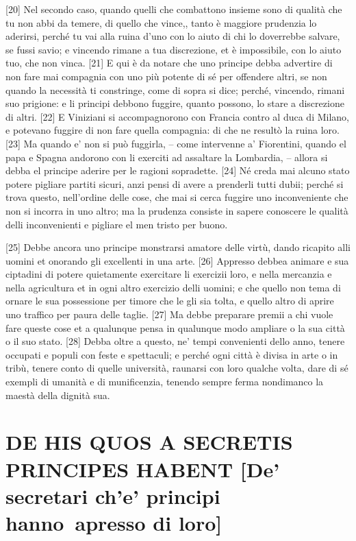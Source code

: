 \quebra

{[}20{]} Nel secondo caso, quando quelli che combattono insieme sono di
qualità che tu non abbi da temere, di quello che vince,, tanto è
maggiore prudenzia lo aderirsi, perché tu vai alla ruina d'uno con lo
aiuto di chi lo doverrebbe salvare, se fussi savio; e vincendo rimane a
tua discrezione, et è impossibile, con lo aiuto tuo, che non vinca.
{[}21{]} E qui è da notare che uno principe debba advertire di non fare
mai compagnia con uno più potente di sé per offendere altri, se non
quando la necessità ti constringe, come di sopra si dice; perché,
vincendo, rimani suo prigione: e li principi debbono fuggire, quanto
possono, lo stare a discrezione di altri. {[}22{]} E Viniziani si
accompagnorono con Francia contro al duca di Milano, e potevano fuggire
di non fare quella compagnia: di che ne resultò la ruina loro. {[}23{]}
Ma quando e' non si può fuggirla, -- come intervenne a' Fiorentini,
quando el papa e Spagna andorono con li exerciti ad assaltare la
Lombardia, -- allora si debba el principe aderire per le ragioni sopradette. {[}24{]} Né creda mai alcuno stato potere pigliare partiti sicuri, anzi pensi di avere a prenderli tutti dubii; perché si trova questo, nell'ordine delle cose, che mai si cerca fuggire uno inconveniente che non si incorra in uno altro; ma la prudenza consiste in sapere conoscere le qualità delli inconvenienti e pigliare el men tristo per buono.

\quebra

{[}25{]} Debbe ancora uno principe monstrarsi amatore delle virtù, dando
ricapito alli uomini et onorando gli excellenti in una arte. {[}26{]}
Appresso debbea animare e sua ciptadini di potere quietamente exercitare
li exercizii loro, e nella mercanzia e nella agricultura et in ogni
altro exercizio delli uomini; e che quello non tema di ornare le sua
possessione per timore che le gli sia tolta, e quello altro di aprire
uno traffico per paura delle taglie. {[}27{]} Ma debbe preparare premii
a chi vuole fare queste cose et a qualunque pensa in qualunque modo
ampliare o la sua città o il suo stato. {[}28{]} Debba oltre a questo,
ne' tempi convenienti dello anno, tenere occupati e populi con feste e
spettaculi; e perché ogni città è divisa in arte o in tribù, tenere
conto di quelle università, raunarsi con loro qualche volta, dare di sé
exempli di umanità e di munificenzia, tenendo sempre ferma nondimanco la
maestà della dignità sua.

\quebra\section{DE HIS QUOS A SECRETIS PRINCIPES HABENT\break
{[}De' secretari ch'e' principi hanno~apresso di loro{]}}

